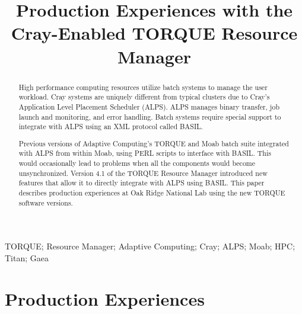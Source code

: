 \documentclass[10pt, conference, compsocconf]{IEEEtran}
\begin{document}
\title{Production Experiences with the Cray-Enabled TORQUE Resource Manager}

\author{
\and
{}
}

\maketitle


\begin{abstract}
High performance computing resources utilize batch systems to manage the user
workload. Cray systems are uniquely different from typical clusters due to
Cray’s Application Level Placement Scheduler (ALPS). ALPS manages binary
transfer, job launch and monitoring, and error handling. Batch systems require
special support to integrate with ALPS using an XML protocol called BASIL.

Previous versions of Adaptive Computing’s TORQUE and Moab batch suite integrated
with ALPS from within Moab, using PERL scripts to interface with BASIL. This
would occasionally lead to problems when all the components would become
unsynchronized. Version 4.1 of the TORQUE Resource Manager introduced new
features that allow it to directly integrate with ALPS using BASIL. This paper
describes production experiences at Oak Ridge National Lab using the new TORQUE
software versions.
\end{abstract}

\begin{IEEEkeywords}
TORQUE; Resource Manager; Adaptive Computing; Cray; ALPS; Moab; HPC; Titan; Gaea
\end{IEEEkeywords}










\section{Production Experiences}














\end{document}
